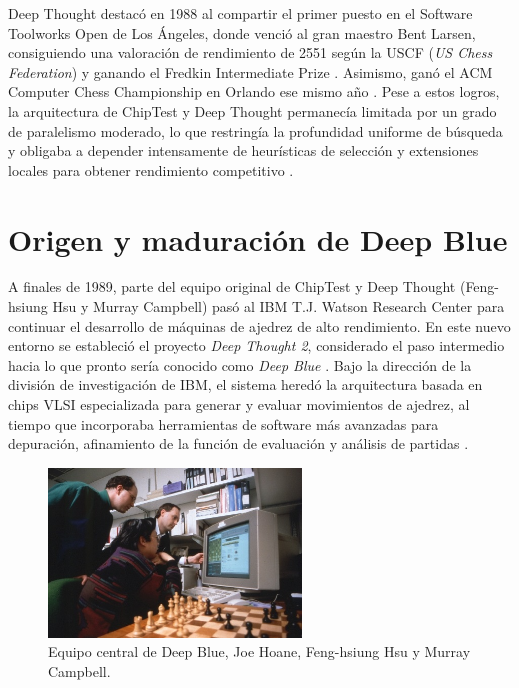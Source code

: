 \documentclass[a4paper, 12pt]{article}
\begin{document}
Deep Thought destacó en 1988 al compartir el primer puesto en el 
Software Toolworks Open de Los Ángeles, donde venció al gran 
maestro Bent Larsen, consiguiendo una valoración de rendimiento 
de 2551 según la USCF (\emph{US Chess Federation}) y ganando 
el Fredkin Intermediate Prize \cite{hsu1990grandmaster}. Asimismo, ganó el ACM Computer Chess 
Championship en Orlando ese mismo año \cite{hsu1990grandmaster}. Pese a 
estos logros, la arquitectura de ChipTest y Deep Thought 
permanecía limitada por un grado de paralelismo moderado, 
lo que restringía la profundidad uniforme de 
búsqueda y obligaba a depender intensamente de heurísticas de 
selección y extensiones locales para obtener rendimiento 
competitivo \cite{hsu1990deep}.








\section{Origen y maduración de Deep Blue}

A finales de 1989, parte del equipo original de ChipTest y Deep 
Thought (Feng-hsiung Hsu y Murray Campbell) pasó al IBM T.J. 
Watson Research Center para continuar el desarrollo de máquinas 
de ajedrez de alto rendimiento. En este nuevo entorno se 
estableció el proyecto \textit{Deep Thought 2}, considerado el 
paso intermedio hacia lo que pronto sería conocido como 
\textit{Deep Blue} \cite{campbell2002deep}. Bajo la dirección de la 
división de investigación de IBM, el sistema heredó la 
arquitectura basada en chips VLSI especializada para generar y 
evaluar movimientos de ajedrez, al tiempo que incorporaba 
herramientas de software más avanzadas para depuración, 
afinamiento de la función de evaluación y análisis de partidas 
\cite{campbell2002deep}.

\begin{figure}[h]
    \centering
    \includegraphics[width=0.6\textwidth]{assets/Deep Blue's core team, Joe Hoane, Feng-hsiung Hsu, and Murray Campbell.jpg}
    \caption{Equipo central de Deep Blue, Joe Hoane, Feng-hsiung Hsu y Murray Campbell.}
    \label{fig:team}
\end{figure}
\end{document}
